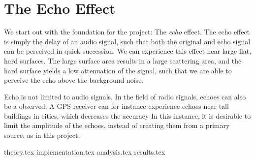 
\section{The Echo Effect}
We start out with the foundation for the project: The \emph{echo} effect. The echo effect is simply the delay of an audio signal, such that both the original and echo signal can be perceived in quick succession. We can experience this effect near large flat, hard surfaces. The large surface area results in a large scattering area, and the hard surface yields a low attenuation of the signal, such that we are able to perceive the echo above the background noise.

Echo is not limited to audio signals. In the field of radio signals, echoes can also be a observed. A GPS receiver can for instance experience echoes near tall buildings in cities, which decreases the accuracy In this instance, it is desirable to limit the amplitude of the echoes, instead of creating them from a primary source, as in this project.

{theory.tex}
{implementation.tex}
{analysis.tex}
{results.tex}
